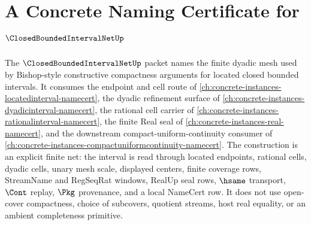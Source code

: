 \chapter{A Concrete Naming Certificate for $\ClosedBoundedIntervalNetUp$}
\label{ch:concrete-instances-closedboundedintervalnet-namecert}

The $\ClosedBoundedIntervalNetUp$ packet names the finite dyadic mesh used by Bishop-style constructive compactness arguments for located closed bounded intervals. It consumes the endpoint and cell route of \autoref{ch:concrete-instances-locatedinterval-namecert}, the dyadic refinement surface of \autoref{ch:concrete-instances-dyadicinterval-namecert}, the rational cell carrier of \autoref{ch:concrete-instances-rationalinterval-namecert}, the finite Real seal of \autoref{ch:concrete-instances-real-namecert}, and the downstream compact-uniform-continuity consumer of \autoref{ch:concrete-instances-compactuniformcontinuity-namecert}. The construction is an explicit finite net: the interval is read through located endpoints, rational cells, dyadic cells, unary mesh scale, displayed centers, finite coverage rows, StreamName and RegSeqRat windows, RealUp seal rows, $\hsame$ transport, $\Cont$ replay, $\Pkg$ provenance, and a local NameCert row. It does not use open-cover compactness, choice of subcovers, quotient streams, host real equality, or an ambient completeness primitive.


